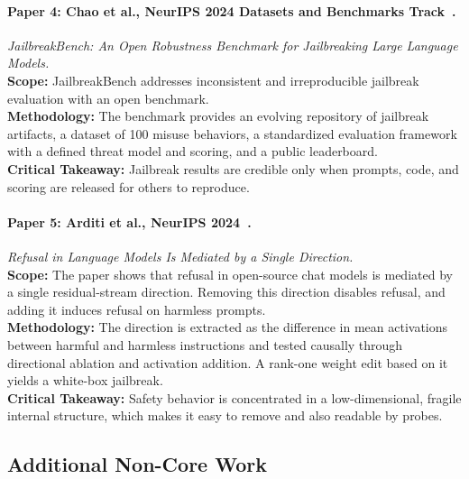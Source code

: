 \documentclass[sigconf,nonacm]{acmart}
\begin{document}
\paragraph{Paper 4: Chao et al., NeurIPS 2024 Datasets and Benchmarks Track~\cite{chao2024jailbreakbench}.}
\emph{JailbreakBench: An Open Robustness Benchmark for Jailbreaking Large Language Models.}\\
\textbf{Scope:} JailbreakBench addresses inconsistent and irreproducible jailbreak evaluation with an open benchmark.\\
\textbf{Methodology:} The benchmark provides an evolving repository of jailbreak artifacts, a dataset of 100 misuse behaviors, a standardized evaluation framework with a defined threat model and scoring, and a public leaderboard.\\
\textbf{Critical Takeaway:} Jailbreak results are credible only when prompts, code, and scoring are released for others to reproduce.

\paragraph{Paper 5: Arditi et al., NeurIPS 2024~\cite{arditi2024refusal}.}
\emph{Refusal in Language Models Is Mediated by a Single Direction.}\\
\textbf{Scope:} The paper shows that refusal in open-source chat models is mediated by a single residual-stream direction. Removing this direction disables refusal, and adding it induces refusal on harmless prompts.\\
\textbf{Methodology:} The direction is extracted as the difference in mean activations between harmful and harmless instructions and tested causally through directional ablation and activation addition. A rank-one weight edit based on it yields a white-box jailbreak.\\
\textbf{Critical Takeaway:} Safety behavior is concentrated in a low-dimensional, fragile internal structure, which makes it easy to remove and also readable by probes.

\subsection{Additional Non-Core Work}
\label{sec:rw-noncore}
\end{document}
